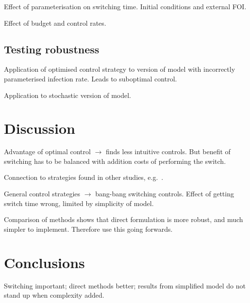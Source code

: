 Effect of parameterisation on switching time. Initial conditions and external FOI.

Effect of budget and control rates.

\subsection{Testing robustness}

Application of optimised control strategy to version of model with incorrectly parameterised infection rate. Leads to suboptimal control.

Application to stochastic version of model.

\section{Discussion}

Advantage of optimal control $\rightarrow$ finds less intuitive controls. But benefit of switching has to be balanced with addition costs of performing the switch.

Connection to strategies found in other studies, e.g.\ \citet{ndeffo_mbah_resource_2011}.

General control strategies $\rightarrow$ bang-bang switching controls. Effect of getting switch time wrong, limited by simplicity of model.

Comparison of methods shows that direct formulation is more robust, and much simpler to implement. Therefore use this going forwards.

\section{Conclusions}

Switching important; direct methods better; results from simplified model do not stand up when complexity added.